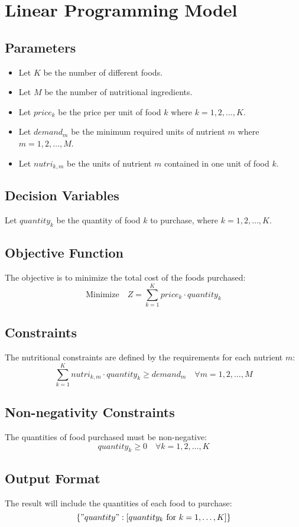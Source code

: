 \documentclass{article}
\begin{document}
\section*{Linear Programming Model}

\subsection*{Parameters}
\begin{itemize}
    \item Let \( K \) be the number of different foods.
    \item Let \( M \) be the number of nutritional ingredients.
    \item Let \( price_k \) be the price per unit of food \( k \) where \( k = 1, 2, \ldots, K \).
    \item Let \( demand_m \) be the minimum required units of nutrient \( m \) where \( m = 1, 2, \ldots, M \).
    \item Let \( nutri_{k, m} \) be the units of nutrient \( m \) contained in one unit of food \( k \).
\end{itemize}

\subsection*{Decision Variables}
Let \( quantity_k \) be the quantity of food \( k \) to purchase, where \( k = 1, 2, \ldots, K \).

\subsection*{Objective Function}
The objective is to minimize the total cost of the foods purchased:
\[
\text{Minimize} \quad Z = \sum_{k=1}^{K} price_k \cdot quantity_k
\]

\subsection*{Constraints}
The nutritional constraints are defined by the requirements for each nutrient \( m \):
\[
\sum_{k=1}^{K} nutri_{k, m} \cdot quantity_k \geq demand_m \quad \forall m = 1, 2, \ldots, M
\]

\subsection*{Non-negativity Constraints}
The quantities of food purchased must be non-negative:
\[
quantity_k \geq 0 \quad \forall k = 1, 2, \ldots, K
\]

\subsection*{Output Format}
The result will include the quantities of each food to purchase:
\[
\{ "quantity": [quantity_k \text{ for } k = 1, \ldots, K] \}
\]
\end{document}
